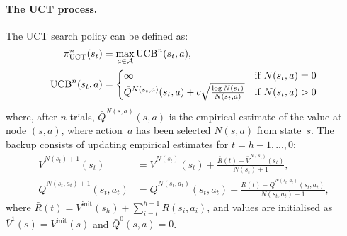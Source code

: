 \documentclass{article}
\newcommand{\cl}[1]{\mathcal{#1}}
\theoremstyle{plain}
\begin{document}
\begin{appendices}
        
        
        

    
        \paragraph{The UCT process.} 
        	The UCT search policy can be defined as:
        \begin{align}
             \pi_{\textnormal{UCT}}^n(s_t) &= \max_{a\in\cl{A}} \text{UCB}^n(s_t,a), \\
             \text{UCB}^n(s_t, a) &= 
            		\begin{cases}
            			\infty & \text{if } N(s_t,a)=0 \\
            			\bar{Q}^{N(s_t,a)}(s_t, a)+c \sqrt{\frac{\log N(s_t)}{N(s_t, a)}} & \text{if } N(s_t,a)>0
            		\end{cases}
        \end{align}
        \noindent where, after $n$ trials, $\bar{Q}^{N(s,a)}(s,a)$ is the empirical estimate of the value at node $(s,a)$, where action~$a$ has been selected $N(s, a)$ from state~$s$. The backup consists of updating empirical estimates for $t=h-1,...,0$:
        \begin{align}
            \bar{V}^{N(s_t)+1}(s_t) &= \bar{V}^{N(s_t)}(s_t) + \frac{\bar{R}(t) - \bar{V}^{N(s_t)}(s_t)}{N(s_t) + 1}, \label{appeq:uct_vbar} \\
            \bar{Q}^{N(s_t,a_t)+1}(s_t, a_t) &= \bar{Q}^{N(s_t,a_t)}(s_t, a_t) + \frac{\bar{R}(t) - \bar{Q}^{N(s_t,a_t)}(s_t, a_t)}{N(s_t, a_t) + 1}, \label{appeq:uct_qbar}
        \end{align}
        \noindent where $\bar{R}(t) = V^{\text{init}}(s_h) + \sum_{i=t}^{h-1} R(s_i,a_i)$, and values are initialised as $\bar{V}^1(s)=V^{\text{init}}(s)$ and $\bar{Q}^0(s,a)=0$. 
        
        
        
        
        
        


\end{appendices}
\end{document}
